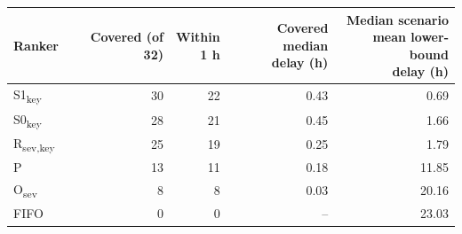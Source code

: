 \begin{tabular}{lrrrr}
\toprule
Ranker & Covered (of 32) & \shortstack{Within\\1 h} & \shortstack{Covered median\\delay (h)} & \shortstack{Median scenario\\mean lower-bound\\delay (h)} \\
\midrule
S1\textsubscript{key} & 30 & 22 & 0.43 & 0.69 \\
S0\textsubscript{key} & 28 & 21 & 0.45 & 1.66 \\
R\textsubscript{sev,key} & 25 & 19 & 0.25 & 1.79 \\
P & 13 & 11 & 0.18 & 11.85 \\
O\textsubscript{sev} & 8 & 8 & 0.03 & 20.16 \\
FIFO & 0 & 0 & -- & 23.03 \\
\bottomrule
\end{tabular}

